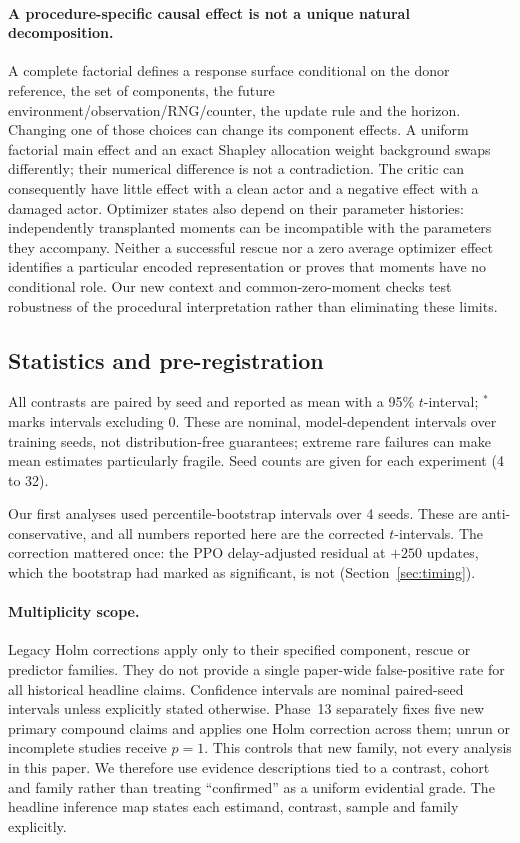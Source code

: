 \documentclass[10pt]{article} %
\newcommand{\sig}{^{\ast}}
\begin{document}
\paragraph{A procedure-specific causal effect is not a unique natural decomposition.}
A complete factorial defines a response surface conditional on the donor reference, the set of components, the future environment/observation/RNG/counter, the update rule and the horizon. Changing one of those choices can change its component effects. A uniform factorial main effect and an exact Shapley allocation weight background swaps differently; their numerical difference is not a contradiction. The critic can consequently have little effect with a clean actor and a negative effect with a damaged actor. Optimizer states also depend on their parameter histories: independently transplanted moments can be incompatible with the parameters they accompany. Neither a successful rescue nor a zero average optimizer effect identifies a particular encoded representation or proves that moments have no conditional role. Our new context and common-zero-moment checks test robustness of the procedural interpretation rather than eliminating these limits.

\subsection{Statistics and pre-registration}
All contrasts are paired by seed and reported as mean with a 95\% $t$-interval; $\sig$ marks intervals excluding 0. These are nominal, model-dependent intervals over training seeds, not distribution-free guarantees; extreme rare failures can make mean estimates particularly fragile. Seed counts are given for each experiment (4 to 32).

Our first analyses used percentile-bootstrap intervals over 4 seeds. These are anti-conservative, and all numbers reported here are the corrected $t$-intervals. The correction mattered once: the PPO delay-adjusted residual at $+250$ updates, which the bootstrap had marked as significant, is not (Section~\ref{sec:timing}).

\paragraph{Multiplicity scope.}
Legacy Holm corrections apply only to their specified component, rescue or predictor families. They do not provide a single paper-wide false-positive rate for all historical headline claims. Confidence intervals are nominal paired-seed intervals unless explicitly stated otherwise. Phase~13 separately fixes five new primary compound claims and applies one Holm correction across them; unrun or incomplete studies receive $p=1$. This controls that new family, not every analysis in this paper. We therefore use evidence descriptions tied to a contrast, cohort and family rather than treating ``confirmed'' as a uniform evidential grade. The headline inference map states each estimand, contrast, sample and family explicitly.
\end{document}
